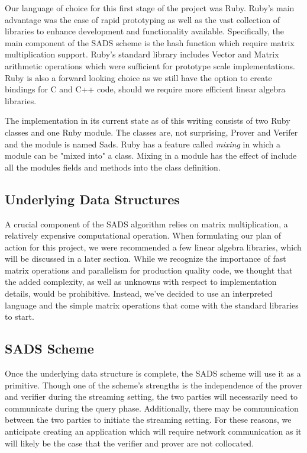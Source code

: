 \documentclass[11pt, letterpaper, oneside]{article}
\begin{document}
	Our language of choice for this first stage of the project was Ruby.
	Ruby's main advantage was the ease of rapid prototyping as well as the vast collection of libraries to enhance development and functionality available.
	Specifically, the main component of the SADS scheme is the hash function which require matrix multiplication support.
	Ruby's standard library includes Vector and Matrix arithmetic operations which were sufficient for prototype scale implementations.
	Ruby is also a forward looking choice as we still have the option to create bindings for C and C++ code, should we require more efficient linear algebra libraries.
	
	The implementation in its current state as of this writing consists of two Ruby classes and one Ruby module.
	The classes are, not surprising, Prover and Verifer and the module is named Sads.
	Ruby has a feature called \textit{mixing} in which a module can be "mixed into" a class.
	Mixing in a module has the effect of include all the modules fields and methods into the class definition.
		
	
	
	
	\subsection{Underlying Data Structures}

		A crucial component of the SADS algorithm relies on matrix multiplication, a relatively expensive computational operation.
		When formulating our plan of action for this project, we were recommended a few linear algebra libraries, which will be discussed in a later section.
		While we recognize the importance of fast matrix operations and parallelism for production quality code, we thought that the added complexity, as well as unknowns with respect to implementation details, would be prohibitive.
		Instead, we've decided to use an interpreted language and the simple matrix operations that come with the standard libraries to start.

	
	\subsection{SADS Scheme}

	Once the underlying data structure is complete, the SADS scheme will use it as a primitive.
	Though one of the scheme's strengths is the independence of the prover and verifier during the streaming setting, the two parties will necessarily need to communicate during the query phase.
	Additionally, there may be communication between the two parties to initiate the streaming setting.
	For these reasons, we anticipate creating an application which will require network communication as it will likely be the case that the verifier and prover are not collocated.
\end{document}
